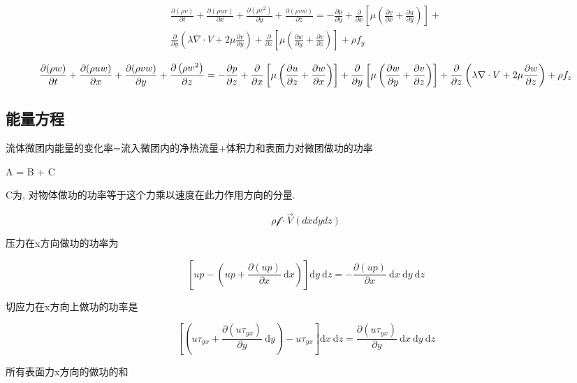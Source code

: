 \documentclass[UTF8]{ctexart}
\begin{document}
$$
	\begin{gathered}
		\frac{\partial(\rho v)}{\partial t}+\frac{\partial(\rho u v)}{\partial x}+\frac{\partial\left(\rho v^{2}\right)}{\partial y}+\frac{\partial(\rho v w)}{\partial z}=-\frac{\partial p}{\partial y}+\frac{\partial}{\partial x}\left[\mu\left(\frac{\partial v}{\partial x}+\frac{\partial u}{\partial y}\right)\right]+ \\
		\frac{\partial}{\partial y}\left(\lambda \nabla \cdot V+2 \mu \frac{\partial v}{\partial y}\right)+\frac{\partial}{\partial z}\left[\mu\left(\frac{\partial w}{\partial y}+\frac{\partial v}{\partial z}\right)\right]+\rho f_{y}
	\end{gathered}
$$

$$
	\frac{\partial(\rho w)}{\partial t}+\frac{\partial(\rho u w)}{\partial x}+\frac{\partial(\rho v w)}{\partial y}+\frac{\partial\left(\rho w^{2}\right)}{\partial z}=-\frac{\partial p}{\partial z}+\frac{\partial}{\partial x}\left[\mu\left(\frac{\partial u}{\partial z}+\frac{\partial w}{\partial x}\right)\right]+ \\
	\frac{\partial}{\partial y}\left[\mu\left(\frac{\partial w}{\partial y}+\frac{\partial v}{\partial z}\right)\right]+\frac{\partial}{\partial z}\left(\lambda \nabla \cdot V+2 \mu \frac{\partial w}{\partial z}\right)+\rho f_{z}
$$
\subsection{能量方程}

流体微团内能量的变化率=流入微团内的净热流量+体积力和表面力对微团做功的功率

A = B + C

C为, 对物体做功的功率等于这个力乘以速度在此力作用方向的分量.

$$
	\rho \mathcal{f} \cdot \vec{V} (dxdydz)
$$

压力在x方向做功的功率为

$$
	\left[u p-\left(u p+\frac{\partial(u p)}{\partial x} \mathrm{~d} x\right)\right] \mathrm{d} y \mathrm{~d} z=-\frac{\partial(u p)}{\partial x} \mathrm{~d} x \mathrm{~d} y \mathrm{~d} z
$$


切应力在x方向上做功的功率是

$$
	\left[\left(u \tau_{y x}+\frac{\partial\left(u \tau_{y x}\right)}{\partial y} \mathrm{~d} y\right)-u \tau_{y x}\right] \mathrm{d} x \mathrm{~d} z=\frac{\partial\left(u \tau_{y x}\right)}{\partial y} \mathrm{~d} x \mathrm{~d} y \mathrm{~d} z
$$

所有表面力x方向的做功的和
\end{document}
